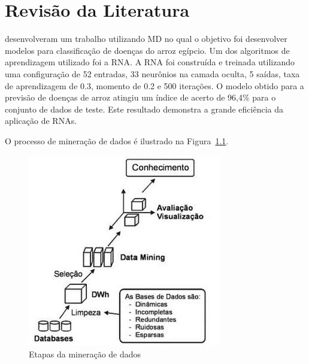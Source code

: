 \chapter{Revisão da Literatura}
 desenvolveram um trabalho utilizando MD no qual o objetivo foi desenvolver modelos para classificação de doenças do arroz egípcio. Um dos algoritmos de aprendizagem utilizado foi a RNA. A RNA foi construída e treinada utilizando uma configuração de 52 entradas, 33 neurônios na camada oculta, 5 saídas, taxa de aprendizagem de 0.3, momento de 0.2 e 500 iterações. O modelo obtido para a previsão de doenças de arroz atingiu um índice de acerto de 96,4\% para o conjunto de dados de teste. Este resultado demonstra a grande eficiência da aplicação de RNAs.

O processo de mineração de dados é ilustrado na Figura~\ref{fig:mineracao}.
\begin{figure}
	\centering
	\caption{Etapas da mineração de dados}\label{fig:mineracao}
	\includegraphics[scale=1.0]{assets/mineracao}
	
\end{figure}


